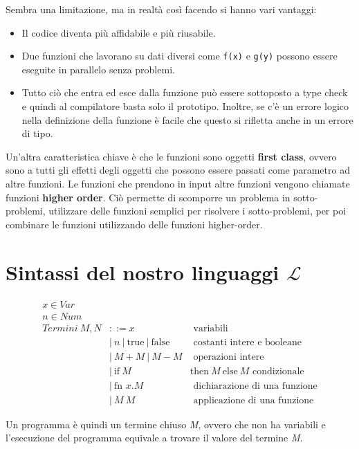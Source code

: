 Sembra una limitazione, ma in realtà così facendo si hanno vari vantaggi:
\begin{itemize}
	\item Il codice diventa più affidabile e più riusabile.
	\item Due funzioni che lavorano su dati diversi come \texttt{f(x)} e \texttt{g(y)} possono essere eseguite in parallelo senza problemi.
	\item Tutto ciò che entra ed esce dalla funzione può essere sottoposto a type check e quindi al compilatore basta solo il prototipo. Inoltre, se c'è un errore logico nella definizione della funzione è facile che questo si rifletta anche in un errore di tipo.
\end{itemize}

\noindent Un'altra caratteristica chiave è che le funzioni sono oggetti \textbf{first class}, ovvero sono a tutti gli effetti degli oggetti che possono essere passati come parametro ad altre funzioni. 
Le funzioni che prendono in input altre funzioni vengono chiamate funzioni \textbf{higher order}.
Ciò permette di scomporre un problema in sotto-problemi, utilizzare delle funzioni semplici per risolvere i sotto-problemi, per poi combinare le funzioni utilizzando delle funzioni higher-order.

\section{Sintassi del nostro linguaggi $\mathcal{L}$}

\begin{align*}
	x \in Var & &\\
	n \in Num & &\\
	Termini \: M, N &::= x &\text{ variabili} \\
								&|\: n \:|\: \text{true} \:|\: \text{false} &\text{ costanti intere e booleane} \\
								&|\: M + M \:|\: M - M &\text{ operazioni intere} \\
								&|\: \text{if} \: M \: &\text{then} \: M \: \text{else} \: M \text{ condizionale} \\
								&|\: \text{fn } x.M &\text{ dichiarazione di una funzione} \\
								&|\: M \: M &\text{ applicazione di una funzione}
\end{align*}

\noindent Un programma è quindi un termine chiuso \textit{M}, ovvero che non ha variabili e l'esecuzione del programma equivale a trovare il valore del termine \textit{M}.

